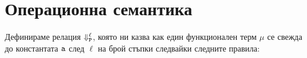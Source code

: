\section{Операционна семантика}




Дефинираме релация $\Downarrow^{\ell}_{\texttt{P}}$, която ни казва как един функционален терм $\mu$
се свежда до константата $\texttt{a}$ след $\ell$ на брой стъпки следвайки следните правила:

